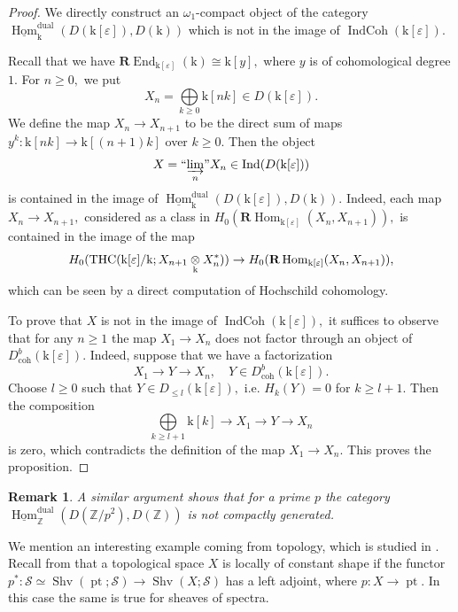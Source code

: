 \documentclass[11pt,leqno]{amsart}
\newtheorem{remark}[theo]{Remark}
\numberwithin{equation}{section}
\def\Z{\mathbb{Z}}
\def\coh{\operatorname{coh}}
\def\bR{{\mathbf R}}
\def\Hom{\operatorname{Hom}}
\def\End{\operatorname{End}}
\newcommand{\tens}[1]{%
  \mathbin{\mathop{\otimes}\displaylimits_{#1}}%
}
\newcommand{\indlim}[1][]{\mathop{\varinjlim}\limits_{#1}}
\newcommand{\inddlim}[1][]{{``{\indlim[#1]}"}}
\newcommand{\biggplus}[1][]{\mathop{\bigoplus}\limits_{#1}}
\newcommand{\IndCoh}{\operatorname{IndCoh}}
\newcommand{\dual}{\operatorname{dual}}
\newcommand{\mk}{\mathrm k}
\newcommand{\cS}{{\mathcal S}}
\newcommand{\veps}{\varepsilon}
\newcommand{\un}{\underline}
\newcommand{\THC}{\operatorname{THC}}
\newcommand{\Shv}{\operatorname{Shv}}
\newcommand{\Ind}{\operatorname{Ind}}
\newcommand{\pt}{\operatorname{pt}}
\begin{document}
\begin{proof}
We directly construct an $\omega_1$-compact object of the category $\un{\Hom}_{\mk}^{\dual}(D(\mk[\veps]),D(\mk))$ which is not in the image of $\IndCoh(\mk[\veps]).$ 

Recall that we have $\bR\End_{\mk[\veps]}(\mk)\cong\mk[y],$ where $y$ is of cohomological degree $1.$ For $n\geq 0,$ we put $$X_n=\biggplus[k\geq 0]\mk[nk]\in D(\mk[\veps]).$$ We define the map $X_n\to X_{n+1}$ to be the direct sum of maps $y^k:\mk[nk]\to \mk[(n+1)k]$ over $k\geq 0.$ Then the object $$X=\inddlim[n]X_n\in\Ind(D(\mk[\veps]))$$ is contained in the image of $\un{\Hom}_{\mk}^{\dual}(D(\mk[\veps]),D(\mk)).$ Indeed, each map $X_n\to X_{n+1},$ considered as a class in $H_0(\bR\Hom_{\mk[\veps]}(X_n,X_{n+1})),$ is contained in the image of the map
\begin{equation*}
H_0(\THC(\mk[\veps]/\mk;X_{n+1}\tens{\mk}X_n^*))\to H_0(\bR\Hom_{\mk[\veps]}(X_n,X_{n+1})),
\end{equation*}
which can be seen by a direct computation of Hochschild cohomology.

To prove that $X$ is not in the image of $\IndCoh(\mk[\veps]),$ it suffices to observe that for any $n\geq 1$ the map $X_1\to X_n$ does not factor through an object of $D^b_{\coh}(\mk[\veps]).$ Indeed, suppose that we have a factorization
\begin{equation*}
X_1\to Y\to X_n,\quad Y\in D^b_{\coh}(\mk[\veps]).
\end{equation*}
Choose $l\geq 0$ such that $Y\in D_{\leq l}(\mk[\veps]),$ i.e. $H_k(Y)=0$ for $k\geq l+1.$ Then the composition
\begin{equation*}
\biggplus[k\geq l+1] \mk[k]\to X_1\to Y\to X_n
\end{equation*}
is zero, which contradicts the definition of the map $X_1\to X_n.$ This proves the proposition. 
\end{proof}

\begin{remark}
A similar argument shows that for a prime $p$ the category $\un{\Hom}_{\Z}^{\dual}(D(\Z/p^2),D(\Z))$ is not compactly generated.
\end{remark}

We mention an interesting example coming from topology, which is studied in \cite{KNP}. Recall from \cite[Definition A.1.5, Proposition A.1.8]{Lur17} that a topological space $X$ is locally of constant shape if the functor $p^*:\cS\simeq\Shv(\pt;\cS)\to\Shv(X;\cS)$ has a left adjoint, where $p:X\to\pt.$ In this case the same is true for sheaves of spectra.
\end{document}
